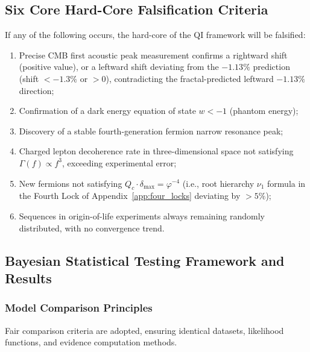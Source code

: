 \documentclass[12pt,a4paper,twocolumn]{article}
\renewcommand{\phi}{\varphi}
\begin{document}
\subsection{Six Core Hard-Core Falsification Criteria}
If any of the following occurs, the hard-core of the QI framework will be falsified:
\begin{enumerate}
\item Precise CMB first acoustic peak measurement confirms a rightward shift (positive value), or a leftward shift deviating from the $-1.13\%$ prediction (shift $<-1.3\%$ or $>0$), contradicting the fractal-predicted leftward $-1.13\%$ direction;
\item Confirmation of a dark energy equation of state $w < -1$ (phantom energy);
\item Discovery of a stable fourth-generation fermion narrow resonance peak;
\item Charged lepton decoherence rate in three-dimensional space not satisfying $\Gamma(f) \propto f^3$, exceeding experimental error;
\item New fermions not satisfying $Q_c \cdot \delta_{\max} = \phi^{-4}$ (i.e., root hierarchy $\nu_1$ formula in the Fourth Lock of Appendix~\ref{app:four_locks} deviating by $>5\%$);
\item Sequences in origin-of-life experiments always remaining randomly distributed, with no convergence trend.
\end{enumerate}

\subsection{Bayesian Statistical Testing Framework and Results}
\subsubsection{Model Comparison Principles}
Fair comparison criteria are adopted, ensuring identical datasets, likelihood functions, and evidence computation methods.
\end{document}
